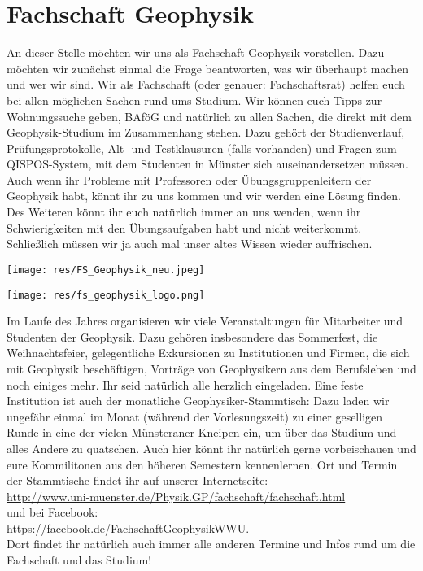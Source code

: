 \section{Fachschaft Geophysik}
\begin{multicols*}{2}
An dieser Stelle möchten wir uns als Fachschaft Geophysik vorstellen.
Dazu möchten wir zunächst einmal die Frage beantworten, was wir überhaupt machen und wer wir sind.
Wir als Fachschaft (oder genauer: Fachschaftsrat) helfen euch bei allen möglichen Sachen rund ums Studium.
Wir können euch Tipps zur Wohnungssuche geben, BAföG und natürlich zu allen Sachen, die direkt mit dem Geophysik-Studium im Zusammenhang stehen.
Dazu gehört der Studienverlauf, Prüfungsprotokolle, Alt- und Testklausuren (falls vorhanden) und Fragen zum QISPOS-System, mit dem Studenten in Münster sich auseinandersetzen müssen.
Auch wenn ihr Probleme mit Professoren oder Übungsgruppenleitern der Geophysik habt, könnt ihr zu uns kommen und wir werden eine Lösung finden.
Des Weiteren könnt ihr euch natürlich immer an uns wenden, wenn ihr Schwierigkeiten mit den Übungsaufgaben habt und nicht weiterkommt.
Schließlich müssen wir ja auch mal unser altes Wissen wieder auffrischen.

\begin{center}
	\texttt{[image: res/FS\_Geophysik\_neu.jpeg]}
	
	\texttt{[image: res/fs\_geophysik\_logo.png]}
\end{center}

Im Laufe des Jahres organisieren wir viele Veranstaltungen für Mitarbeiter und Studenten der Geophysik.
Dazu gehören insbesondere das Sommerfest, die Weihnachtsfeier, gelegentliche Exkursionen zu Institutionen und Firmen, die sich mit Geophysik beschäftigen, Vorträge von Geophysikern aus dem Berufsleben und noch einiges mehr.
Ihr seid natürlich alle herzlich eingeladen.
Eine feste Institution ist auch der monatliche Geophysiker-Stammtisch:
Dazu laden wir ungefähr einmal im Monat (während der Vorlesungszeit) zu einer geselligen Runde in eine der vielen Münsteraner Kneipen ein, um über das Studium und alles Andere zu quatschen.
Auch hier könnt ihr natürlich gerne vorbeischauen und eure Kommilitonen aus den höheren Semestern kennenlernen.
Ort und Termin der Stammtische findet ihr auf unserer Internetseite:\\
\url{http://www.uni-muenster.de/Physik.GP/fachschaft/fachschaft.html}\\
und bei Facebook:\\
\url{https://facebook.de/FachschaftGeophysikWWU}.\\
Dort findet ihr natürlich auch immer alle anderen Termine und Infos rund um die Fachschaft und das Studium!


\end{multicols*}
